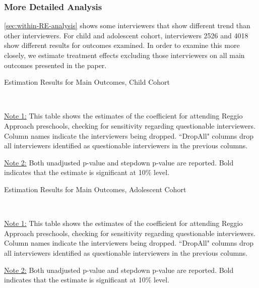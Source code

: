 \subsubsection{More Detailed Analysis}

\ref{sec:within-RE-analysis} shows some interviewers that show different trend than other interviewers. For child and adolescent cohort, interviewers 2526 and 4018 show different results for outcomes examined. In order to examine this more closely, we estimate treatment effects excluding those interviewers on all main outcomes presented in the paper. 

\begin{table}[H] \caption{Estimation Results for Main Outcomes, Child Cohort} \label{ols-M-child-sensitivity}
\scalebox{0.7}{}
\vspace{1ex} \\
\footnotesize\raggedright{\underline{Note 1:} This table shows the estimates of the coefficient for attending Reggio Approach preschools, checking for sensitivity regarding questionable interviewers. Column names indicate the interviewers being dropped. ``DropAll" columns drop all interviewers identified as questionable interviewers in the previous columns.}

\footnotesize\raggedright{\underline{Note 2:} Both unadjusted p-value and stepdown p-value are reported. Bold indicates that the estimate is significant at 10\% level.}
\end{table}


\begin{table}[H] \caption{Estimation Results for Main Outcomes, Adolescent Cohort} \label{ols-M-adol-sensitivity}
\scalebox{0.7}{}
\vspace{1ex} \\
\footnotesize\raggedright{\underline{Note 1:} This table shows the estimates of the coefficient for attending Reggio Approach preschools, checking for sensitivity regarding questionable interviewers. Column names indicate the interviewers being dropped. ``DropAll" columns drop all interviewers identified as questionable interviewers in the previous columns.}

\footnotesize\raggedright{\underline{Note 2:} Both unadjusted p-value and stepdown p-value are reported. Bold indicates that the estimate is significant at 10\% level.}
\end{table}





